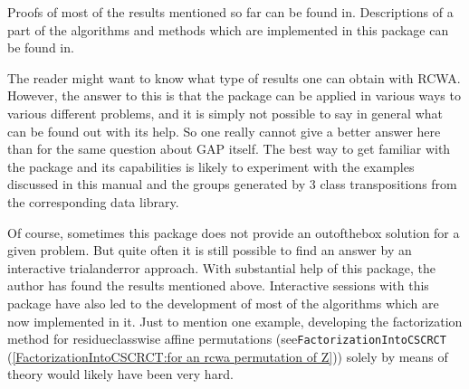 \documentclass[a4paper,11pt]{report}
\begin{document}
{ Proofs of most of the results mentioned so far can be found in{\nobreakspace}\cite{Kohl09}. Descriptions of a part of the algorithms and methods which are implemented
in this package can be found in{\nobreakspace}\cite{Kohl08b}. 

 The reader might want to know what type of results one can obtain with \textsf{RCWA}. However, the answer to this is that the package can be applied in various
ways to various different problems, and it is simply not possible to say in
general what can be found out with its help. So one really cannot give a
better answer here than for the same question about \textsf{GAP} itself. The best way to get familiar with the package and its capabilities is
likely to experiment with the examples discussed in this manual and the groups
generated by 3 class transpositions from the corresponding data library. 

 Of course, sometimes this package does not provide an
out\texttt{}of\texttt{}the\texttt{}box
solution for a given problem. But quite often it is still possible to find an
answer by an interactive trial\texttt{}and\texttt{}error
approach. With substantial help of this package, the author has found the
results mentioned above. Interactive sessions with this package have also led
to the development of most of the algorithms which are now implemented in it.
Just to mention one example, developing the factorization method for
residue\texttt{}class\texttt{}wise affine permutations
(see{\nobreakspace}\texttt{FactorizationIntoCSCRCT} (\ref{FactorizationIntoCSCRCT:for an rcwa permutation of Z})) solely by means of theory would likely have been very hard.  }

       
\end{document}
